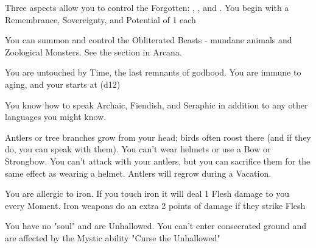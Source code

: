 Three aspects allow you to control the Forgotten:  , , and .  You begin with a Remembrance, Sovereignty, and Potential of 1 each
    


   You can summon and control the Obliterated Beasts - mundane animals and Zoological Monsters.  See the section  in Arcana.

  
  You are untouched by Time, the last remnants of godhood.  You are immune to aging, and your \DEATH starts at  (d12)  


  You know how to speak Archaic, Fiendish, and Seraphic in addition to any other languages you might know.



  Antlers or tree branches grow from your head; birds often roost there (and if they do, you can speak with them).  You can't wear helmets or use a Bow or Strongbow. You can't attack with your antlers, but you can sacrifice them for the same effect as wearing a helmet. Antlers will regrow during a Vacation.



  You are allergic to iron.  If you touch iron it will deal 1 Flesh damage to you every Moment.  Iron weapons do an extra 2 points of damage if they strike Flesh

    
  You have no "soul" and are Unhallowed. You can't enter consecrated ground and are affected by the Mystic ability "Curse the Unhallowed"



